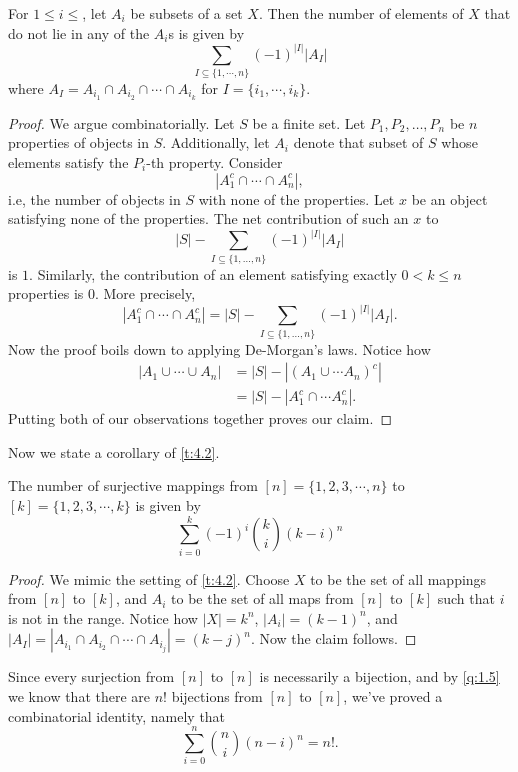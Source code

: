 \begin{theorem}
For $1\leq i\leq$, let $A_i$ be subsets of a set $X$. Then the number of elements of $X$ that do not lie in any of the $A_i$s is given by
\[
\sum_{I\subseteq \{1,\cdots,n\}}(-1)^{|I|}|A_I|
\] where $A_I = A_{i_1}\cap A_{i_2}\cap \cdots \cap A_{i_k}$ for $I=\{i_1,\cdots,i_k\}$. 
\label{t:4.2}
\end{theorem}
\begin{proof}
We argue combinatorially. Let $S$ be a finite set. Let $P_1,P_2,\ldots,P_n$ be $n$ properties of objects in $S$. Additionally, let $A_i$ denote that subset of $S$ whose elements satisfy the $P_i$-th property. Consider \[
|A_1^c \cap \cdots \cap A_n^c|,
\] i.e, the number of objects in $S$ with none of the properties. Let $x$ be an object satisfying none of the properties. The net contribution of such an $x$ to 
\[
|S| - \sum_{I\subseteq \{1,\ldots,n\}} (-1)^{|I|}|A_I|
\] is $1$. Similarly, the contribution of an element satisfying exactly $0<k\leq n$ properties is $0$. More precisely,
\[
|A_1^c\cap \cdots \cap A_n^c| = |S| - \sum_{I\subseteq \{1,\ldots,n\}}(-1)^{|I|}|A_I|.
\]
Now the proof boils down to applying De-Morgan's laws. Notice how 
\begin{align*}
|A_1\cup \cdots \cup A_n| &= |S|-|(A_1\cup \cdots A_n)^c| \\
&= |S| - |A_1^c\cap \cdots A_n^c|.
\end{align*}
Putting both of our observations together proves our claim. 
\end{proof}
Now we state a corollary of \cref{t:4.2}.
\begin{claim}
The number of surjective mappings from $[n]=\{1,2,3,\cdots,n\}$ to $[k]=\{1,2,3,\cdots,k\}$ is given by \[
    \sum_{i=0}^{k}(-1)^i\binom{k}{i}(k-i)^n
\]
\label{c:SurjMap}
\end{claim}
\begin{proof}
We mimic the setting of \cref{t:4.2}. Choose $X$ to be the set of all mappings from $[n]$ to $[k]$, and $A_i$ to be the set of all maps from $[n]$ to $[k]$ such that $i$ is not in the range. Notice how $|X|=k^n$, $|A_i|=(k-1)^n$, and $|A_I| = |A_{i_1}\cap A_{i_2}\cap \cdots \cap A_{i_j}|=(k-j)^n$. Now the claim follows. 
\end{proof}

\begin{remark}
Since every surjection from $[n]$ to $[n]$ is necessarily a bijection, and by \cref{q:1.5} we know that there are $n!$ bijections from $[n]$ to $[n]$, we've proved a combinatorial identity, namely that
\[
\sum_{i=0}^{n}\binom{n}{i}(n-i)^n=n!.
\]
\end{remark}
